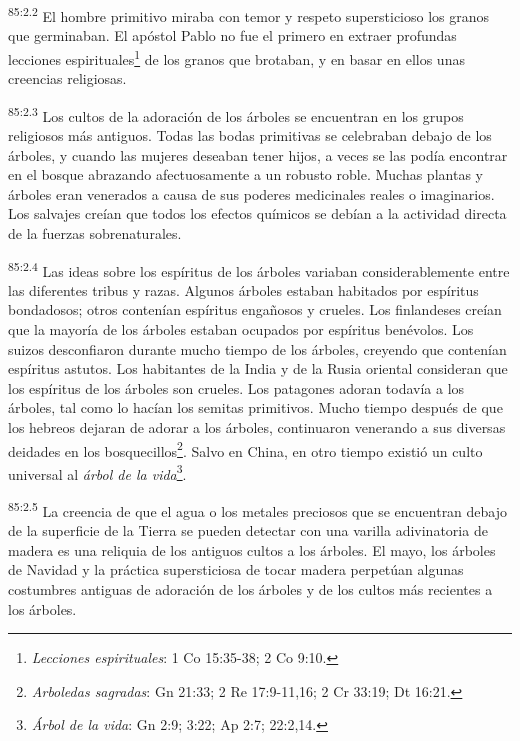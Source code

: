 \par
\textsuperscript{85:2.2} El hombre primitivo miraba con temor y respeto supersticioso los granos que germinaban. El apóstol Pablo no fue el primero en extraer profundas lecciones espirituales\footnote{\textit{Lecciones espirituales}: 1 Co 15:35-38; 2 Co 9:10.} de los granos que brotaban, y en basar en ellos unas creencias religiosas.

\par
\textsuperscript{85:2.3} Los cultos de la adoración de los árboles se encuentran en los grupos religiosos más antiguos. Todas las bodas primitivas se celebraban debajo de los árboles, y cuando las mujeres deseaban tener hijos, a veces se las podía encontrar en el bosque abrazando afectuosamente a un robusto roble. Muchas plantas y árboles eran venerados a causa de sus poderes medicinales reales o imaginarios. Los salvajes creían que todos los efectos químicos se debían a la actividad directa de la fuerzas sobrenaturales.

\par
\textsuperscript{85:2.4} Las ideas sobre los espíritus de los árboles variaban considerablemente entre las diferentes tribus y razas. Algunos árboles estaban habitados por espíritus bondadosos; otros contenían espíritus engañosos y crueles. Los finlandeses creían que la mayoría de los árboles estaban ocupados por espíritus benévolos. Los suizos desconfiaron durante mucho tiempo de los árboles, creyendo que contenían espíritus astutos. Los habitantes de la India y de la Rusia oriental consideran que los espíritus de los árboles son crueles. Los patagones adoran todavía a los árboles, tal como lo hacían los semitas primitivos. Mucho tiempo después de que los hebreos dejaran de adorar a los árboles, continuaron venerando a sus diversas deidades en los bosquecillos\footnote{\textit{Arboledas sagradas}: Gn 21:33; 2 Re 17:9-11,16; 2 Cr 33:19; Dt 16:21.}. Salvo en China, en otro tiempo existió un culto universal al \textit{árbol de la vida}\footnote{\textit{Árbol de la vida}: Gn 2:9; 3:22; Ap 2:7; 22:2,14.}.

\par
\textsuperscript{85:2.5} La creencia de que el agua o los metales preciosos que se encuentran debajo de la superficie de la Tierra se pueden detectar con una varilla adivinatoria de madera es una reliquia de los antiguos cultos a los árboles. El mayo, los árboles de Navidad y la práctica supersticiosa de tocar madera perpetúan algunas costumbres antiguas de adoración de los árboles y de los cultos más recientes a los árboles.

